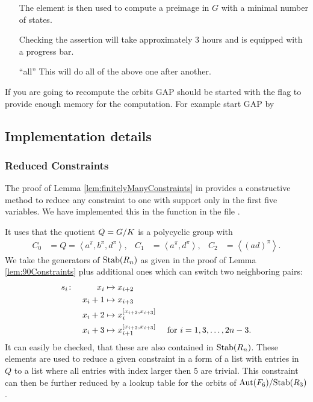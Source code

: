 \documentclass[a4paper,11pt]{amsart}
\begin{document}
\begin{itemize}
		      The element is then used to compute a preimage in $G$ with a minimal 
		      number of states.

		      Checking the assertion will take approximately $3$ hours and is equipped 
		      with a progress bar. 
  \item [``all''] This will do all of the above one after another.		      
   \end{itemize}
If you are going to recompute the orbits GAP should be started with the  flag
to provide enough memory for the computation. For example start GAP by 


\subsection{Implementation details}
\label{sec:gap_details}
\subsubsection{Reduced Constraints}
The proof of Lemma \ref{lem:finitelyManyConstraints} in \cite{Lysenok:QudraticEquationsInGrig} 
provides a constructive method to reduce any constraint to one with support
only in the first five variables. 
We have implemented this in the function  in the file
.

It uses that the quotient $Q={G/K}$ is a polycyclic group with 
\begin{align*}
 C_0 &= Q = \left<a^\pi,b^\pi,d^\pi\right>, &
 C_1 &= \left<a^\pi,d^\pi\right>, &
 C_2 &= \left<(ad)^\pi\right>.
\end{align*}
We take the generators of $\textup{Stab}(R_n)$ as given in the proof of Lemma \ref{lem:90Constraints}
plus additional ones which can switch two neighboring pairs:
\begin{align*}
 s_i &\colon &x_i&\mapsto x_{i+2}&\\
	    &&x_i+1&\mapsto x_{i+3}&\\
	    &&x_i+2&\mapsto x_{i}^{[x_{i+2},x_{i+3}]}&\\
	    &&x_i+3&\mapsto x_{i+1}^{[x_{i+2},x_{i+3}]} & \textup{ for }i = 1,3,\ldots,2n-3.
\end{align*}
It can easily be checked, that these are also contained in $\textup{Stab}(R_n)$. These elements
are used to reduce a given constraint in a form of a list with entries in $Q$ to a
list where all entries with index larger then $5$ are trivial. 
This constraint can then be further reduced by a lookup table for the orbits
of ${\textup{Aut}(F_6)/\textup{Stab}(R_3)}$. 
\end{document}
